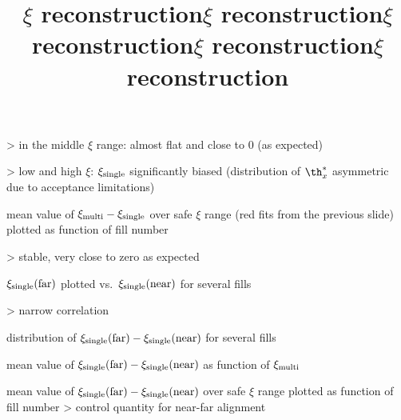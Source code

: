\>> in the middle $\xi$ range: almost flat and close to 0 (as expected)

\>> low and high $\xi$: $\xi_{\rm single}$ significantly biased (distribution of $\th^*_x$ asymmetric due to acceptance limitations)



\newpage %
\title{$\xi$ reconstruction}

\> mean value of $\xi_{\rm multi} - \xi_{\rm single}$ over safe $\xi$ range (red fits from the previous slide) plotted as function of fill number

\centerline{}

\>> stable, very close to zero as expected

\newpage %
\title{$\xi$ reconstruction}

\> $\xi_{\rm single}(\hbox{far})$ plotted vs.~$\xi_{\rm single}(\hbox{near})$ for several fills

\centerline{}

\>> narrow correlation

\newpage %
\title{$\xi$ reconstruction}

\> distribution of $\xi_{\rm single}(\hbox{far}) - \xi_{\rm single}(\hbox{near})$ for several fills


\centerline{}

\newpage %
\title{$\xi$ reconstruction}

\> mean value of $\xi_{\rm single}(\hbox{far}) - \xi_{\rm single}(\hbox{near})$ as function of $\xi_{\rm multi}$

\centerline{}



\newpage %
\title{$\xi$ reconstruction}

\> mean value of $\xi_{\rm single}(\hbox{far}) - \xi_{\rm single}(\hbox{near})$ over safe $\xi$ range plotted as function of fill number
\>> control quantity for near-far alignment

